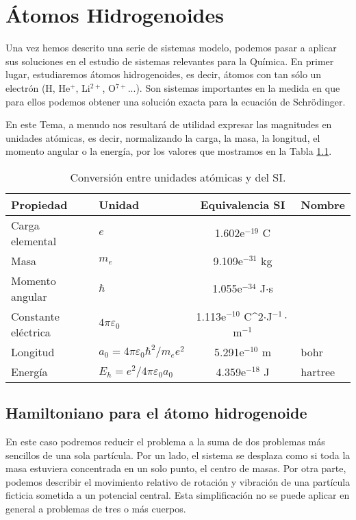 \chapter{Átomos Hidrogenoides}
Una vez hemos descrito una serie de sistemas modelo, podemos pasar a aplicar
sus soluciones en el estudio de sistemas relevantes para la Química.
En primer lugar, estudiaremos átomos hidrogenoides, es decir, átomos con tan
sólo un electrón (H, He$^+$, Li$^{2+}$, O$^{7+}$...). Son sistemas importantes
en la medida en que para ellos podemos obtener una solución exacta para la 
ecuación de Schrödinger.

En este Tema, a menudo nos resultará de utilidad expresar las 
magnitudes en unidades atómicas, es decir, normalizando la carga, 
la masa, la longitud, el momento angular o la energía, por los valores 
que mostramos en la Tabla \ref{tb:au}.

\begin{table}[b!]
    \centering
    \small{}
    \begin{tabular}{|l|l|c|l|}
    \hline
         Propiedad & Unidad & Equivalencia SI& Nombre  \\
    \hline
    \hline
         Carga elemental &$e$ & 1.602e$^{-19}$ C & \\ 
         Masa & $m_e$ & 9.109e$^{-31}$ kg & \\ 
         Momento angular & $\hbar$ & 1.055e$^{-34}$ J$\cdot$s & \\ 
         Constante eléctrica & $4\pi \varepsilon_0$ & 1.113e$^{-10}$ C^2$\cdot$J$^{-1}\cdot$m$^{-1}$ &\\
         Longitud & $a_0=4\pi \varepsilon_0\hbar^2/m_ee^2$ & 5.291e$^{-10}$ m & bohr \\ 
         Energía & $E_h=e^2/4\pi \varepsilon_0a_0$  & 4.359e$^{-18}$ J & hartree \\ 
    \hline
    \end{tabular}
    \caption{Conversión entre unidades atómicas y del SI.}
    \label{tb:au}
\end{table}

\section{Hamiltoniano para el átomo hidrogenoide}
En este caso podremos reducir el problema a la suma de dos problemas 
más sencillos de una sola partícula. Por un lado, el sistema se 
desplaza como si toda la masa estuviera concentrada en un solo punto,
el centro de masas. Por otra parte, podemos describir el movimiento 
relativo de rotación y vibración de una partícula ficticia sometida 
a un potencial central. Esta simplificación no se puede aplicar en 
general a problemas de tres o más cuerpos.

